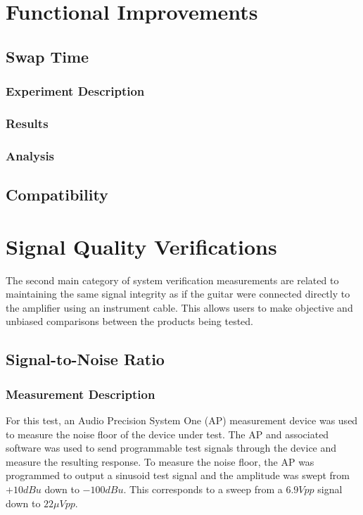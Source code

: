 \section{Functional Improvements}
	\subsection{Swap Time}
		\subsubsection{Experiment Description}
		\subsubsection{Results}
		\subsubsection{Analysis}
	\subsection{Compatibility}
\section{Signal Quality Verifications}

The second main category of system verification measurements are related to maintaining the same signal integrity as if the guitar were connected directly to the amplifier using an instrument cable.  This allows users to make objective and unbiased comparisons between the products being tested.

	\subsection{Signal-to-Noise Ratio}
		\subsubsection{Measurement Description}
		For this test, an Audio Precision System One (AP) measurement device was used to measure the noise floor of the device under test.  The AP and associated software was used to send programmable test signals through the device and measure the resulting response.  To measure the noise floor, the AP was programmed to output a sinusoid test signal and the amplitude was swept from $+10 dBu$ down to $-100 dBu$.  This corresponds to a sweep from a $6.9Vpp$ signal down to $22\mu Vpp$.

